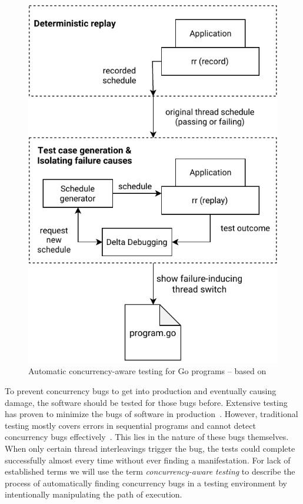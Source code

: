 \documentclass[english]{lni}
\begin{document}
\begin{figure}
    \centering
    \includegraphics[height=0.4\textheight]{figures/Concurrency-Testing.pdf}
    \caption{Automatic concurrency-aware testing for Go programs -- based on\cite{acm2002}}
    \label{fig:testing}
\end{figure}

To prevent concurrency bugs to get into production and eventually causing damage, the software should be tested for those bugs before.
Extensive testing has proven to minimize the bugs of software in production~\cite{makinen2014testing}.
However, traditional testing mostly covers errors in sequential programs and cannot detect concurrency bugs effectively~\cite{lu2008mistakes}.
This lies in the nature of these bugs themselves.
When only certain thread interleavings trigger the bug, the tests could complete successfully almost every time without ever finding a manifestation.
For lack of established terms we will use the term \emph{concurrency-aware testing} to describe the process of automatically finding concurrency bugs in a testing environment by intentionally manipulating the path of execution.
\end{document}
